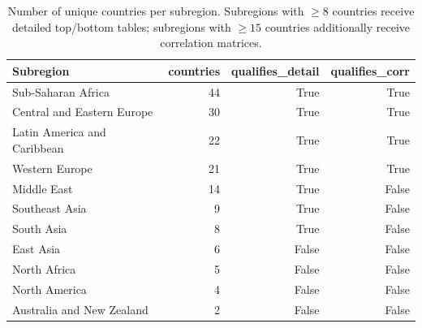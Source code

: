 \begin{table}
\caption{Number of unique countries per subregion. Subregions with $\geq 8$ countries receive detailed top/bottom tables; subregions with $\geq 15$ countries additionally receive correlation matrices.}
\label{tab:country-dist}
\begin{tabular}{lrrr}
\toprule
Subregion & countries & qualifies\_detail & qualifies\_corr \\
\midrule
Sub-Saharan Africa & 44 & True & True \\
Central and Eastern Europe & 30 & True & True \\
Latin America and Caribbean & 22 & True & True \\
Western Europe & 21 & True & True \\
Middle East & 14 & True & False \\
Southeast Asia & 9 & True & False \\
South Asia & 8 & True & False \\
East Asia & 6 & False & False \\
North Africa & 5 & False & False \\
North America & 4 & False & False \\
Australia and New Zealand & 2 & False & False \\
\bottomrule
\end{tabular}
\end{table}
